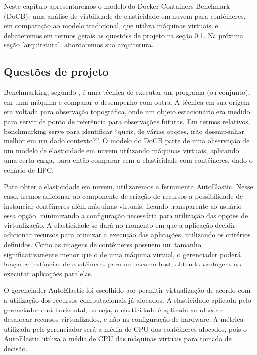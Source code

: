 \documentclass[twoside,english,brazilian]{UNISINOSartigo}
\begin{document}
Neste capítulo apresentaremos o modelo do Docker Containers Benchmark (DoCB), uma análise de viabilidade de elasticidade em nuvem para contêineres, em comparação ao modelo tradicional, que utiliza máquinas virtuais. e debateremos em termos gerais as questões de projeto na seção \ref{questao}. Na próxima seção \ref{arquitetura}, abordaremos sua arquitetura. 

\subsection{Questões de projeto}
\label{questao}

Benchmarking, segundo , é uma técnica de executar um programa (ou conjunto), em uma máquina e comparar o desempenho com outra. A técnica em sua origem era voltada para observação topográfica, onde um objeto estacionário era medido para servir de ponto de referência para observações futuras. Em termos relativos, benchmarking serve para identificar ``quais, de várias opções, irão desempenhar melhor em um dado contexto?''. O modelo do DoCB parte de uma observação de um modelo de elasticidade em nuvem utilizando máquinas virtuais, aplicando uma certa carga, para então comparar com a elasticidade com contêineres, dado o cenário de HPC.

Para obter a elasticidade em nuvem, utilizaremos a ferramenta AutoElastic. Nesse caso, iremos adicionar ao componente de criação de recursos a possibilidade de instanciar contêineres além máquinas virtuais, ficando transparente ao usuário essa opção, minimizando a configuração necessária para utilização das opções de virtualização. A elasticidade se dará no momento em que a aplicação decidir adicionar recursos para otimizar a execução das aplicações, utilizando os critérios definidos. Como as imagens de contêineres possuem um tamanho significativamente menor que o de uma máquina virtual, o gerenciador poderá lançar \textit{n} instâncias de contêineres para um mesmo host, obtendo vantagens ao executar aplicações paralelas. 

O gerenciador AutoElastic foi escolhido por permitir virtualização de acordo com a utilização dos recursos computacionais já alocados. A elasticidade aplicada pelo gerenciador será horizontal, ou seja, a elasticidade é aplicada ao alocar e desalocar recursos virtualizados, e não na configuração de hardware. A métrica utilizada pelo gerenciador será a média de CPU dos contêineres alocados, pois o AutoElastic utiliza a média de CPU das máquinas virtuais para tomada de decisão.
\end{document}
